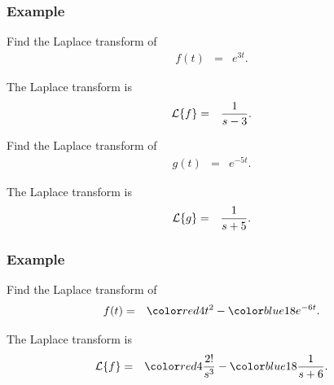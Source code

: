 \begin{frame}
  \frametitle{Example}

  Find the Laplace transform of 
  \begin{eqnarray*}
    f(t) & = & e^{3t}.
  \end{eqnarray*}

  {
    
    The Laplace transform is
    \begin{eqnarray*}
      \laplace{f} & = & \frac{1}{s-3}.
    \end{eqnarray*}

  }

  {
    Find the Laplace transform of 
    \begin{eqnarray*}
      g(t) & = & e^{-5t}.
    \end{eqnarray*}

  }

  {
    The Laplace transform is
    \begin{eqnarray*}
      \laplace{g} & = & \frac{1}{s+5}.
    \end{eqnarray*}
  }


\end{frame}


\begin{frame}
  \frametitle{Example}

  Find the Laplace transform of 
  \begin{eqnarray*}
    f(t) & = & \redText{4t^2} - \blueText{18 e^{-6t}}.
  \end{eqnarray*}

  {

    The Laplace transform is
    \begin{eqnarray*}
      \laplace{f} & = & \redText{4 \frac{2!}{s^3}} - \blueText{18 \frac{1}{s+6}}.
    \end{eqnarray*}

  }

\end{frame}


